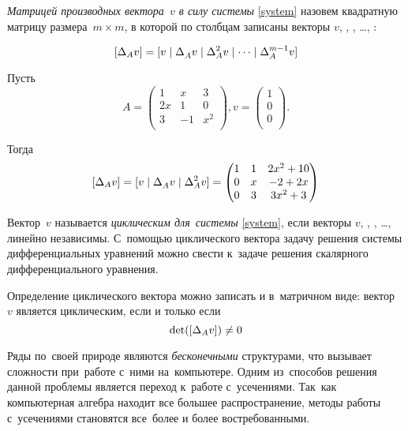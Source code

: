 \emph{Матрицей производных вектора~$v$ в силу системы} \eqref{system} назовем квадратную матрицу размера~$m \times m$,
в которой по столбцам записаны векторы $v$, \diffVector, \diffVector[2], \dots, \diffVector[m-1]:

\begin{equation}
	\diffMatrix = [v \mid \diffVector \mid \diffVector[2] \mid \dots \mid \diffVector[m-1]]
    \label{diffMatrix}
\end{equation}

\begin{example}
	Пусть
	\begin{equation*}
		A = 
		\begin{pmatrix}
			1 & x & 3 \\
			2x & 1 & 0 \\
			3 & -1 & x^2 \\
		\end{pmatrix},
		v =
		\begin{pmatrix}
			1 \\
			0 \\
			0 \\
		\end{pmatrix}.
	\end{equation*}
    
	Тогда
	\begin{equation*}
		\diffMatrix = [v \mid \diffVector \mid \diffVector[2]] = 
		\begin{pmatrix}
			1 & 1 & 2x^2 + 10 \\
			0 & x & -2 + 2x \\
			0 & 3 & 3x^2 + 3 \\
		\end{pmatrix}
	\end{equation*}
\end{example}

Вектор~$v$ называется \emph{циклическим для~системы} \eqref{system}, если векторы $v$, \diffVector, \diffVector[2], \dots, \diffVector[m-1] линейно независимы.
С~помощью циклического вектора задачу решения системы дифференциальных уравнений можно свести к~задаче решения скалярного дифференциального уравнения.

Определение циклического вектора можно записать и в~матричном виде:
вектор~$v$ является циклическим, если и только если
\begin{equation}
	\dett(\diffMatrix) \neq 0
	\label{diffMatrixNotZero}
\end{equation}

Ряды по~своей природе являются \emph{бесконечными} структурами, что вызывает сложности при~работе с~ними на~компьютере.
Одним из~способов решения данной проблемы является переход к~работе с~усечениями.
Так~как компьютерная алгебра находит все большее распространение,
методы работы с~усечениями становятся все~более и более востребованными.
\medskip

